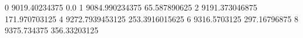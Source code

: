 0 9019.40234375 0.0
1 9084.990234375 65.587890625
2 9191.373046875 171.970703125
4 9272.7939453125 253.3916015625
6 9316.5703125 297.16796875
8 9375.734375 356.33203125
